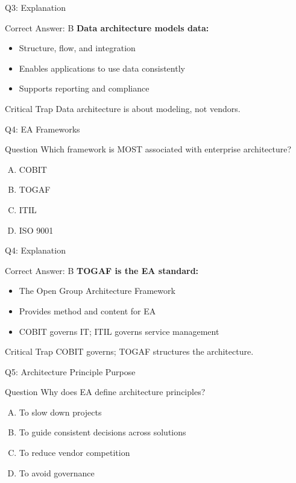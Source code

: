 \documentclass{beamer}
\begin{document}
	\begin{frame}{Q3: Explanation}
		\begin{block}{Correct Answer: B}
			\textbf{Data architecture models data:}
			\begin{itemize}
				\item Structure, flow, and integration
				\item Enables applications to use data consistently
				\item Supports reporting and compliance
			\end{itemize}
		\end{block}
		\begin{alertblock}{Critical Trap}
			Data architecture is about modeling, not vendors.
		\end{alertblock}
	\end{frame}
	
	\begin{frame}{Q4: EA Frameworks}
		\begin{block}{Question}
			Which framework is MOST associated with enterprise architecture?
		\end{block}
		\begin{enumerate}[(A)]
			\item COBIT
			\item TOGAF
			\item ITIL
			\item ISO 9001
		\end{enumerate}
	\end{frame}
	
	\begin{frame}{Q4: Explanation}
		\begin{block}{Correct Answer: B}
			\textbf{TOGAF is the EA standard:}
			\begin{itemize}
				\item The Open Group Architecture Framework
				\item Provides method and content for EA
				\item COBIT governs IT; ITIL governs service management
			\end{itemize}
		\end{block}
		\begin{alertblock}{Critical Trap}
			COBIT governs; TOGAF structures the architecture.
		\end{alertblock}
	\end{frame}
	
	\begin{frame}{Q5: Architecture Principle Purpose}
		\begin{block}{Question}
			Why does EA define architecture principles?
		\end{block}
		\begin{enumerate}[(A)]
			\item To slow down projects
			\item To guide consistent decisions across solutions
			\item To reduce vendor competition
			\item To avoid governance
		\end{enumerate}
	\end{frame}
	
\end{document}
